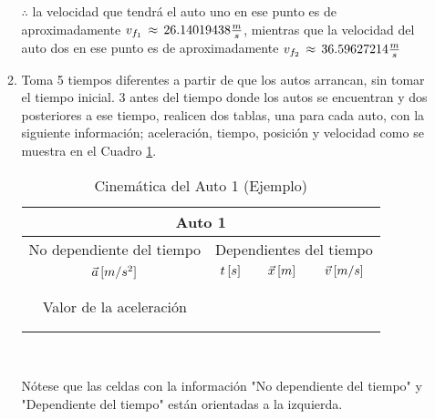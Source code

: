 \documentclass[letterpaper, 12pt]{article}
\begin{document}
\begin{enumerate}
\begin{enumerate}
            $\therefore$ \thinspace la velocidad que tendrá el auto uno en ese punto es de aproximadamente $v_{f_{1}} \thinspace \approx \thinspace 26.14019438 \frac{m}{s}$, mientras que la velocidad del auto dos en ese punto es de aproximadamente $v_{f_{2}} \thinspace \approx \thinspace 36.59627214 \frac{m}{s}$ \\
            
            \item Toma 5 tiempos diferentes a partir de que los autos arrancan, sin tomar el tiempo inicial. 3 antes del tiempo donde los autos se encuentran y dos posteriores a ese tiempo, realicen dos tablas, una para cada auto, con la siguiente información; aceleración, tiempo, posición y velocidad como se muestra en el Cuadro \ref{Cuadro 1: Cinemática del Auto 1 (Ejemplo)}.\\
            
            \begin{table}[h]
            \centering
                    \begin{tabular}{c|c|c|c|c|c}\hline \hline
                       \multicolumn{6}{c}{Auto 1}\\\hline
                       \multicolumn{3}{l|}{No dependiente del tiempo} & \multicolumn{3}{|l}{Dependientes del tiempo}\\\hline
                       \multicolumn{3}{c|}{$\vec{a}\thinspace [m/s^{2}]$} & {$t\thinspace[s]$} & {$\vec{x}\thinspace[m]$} & {$\vec{v}\thinspace[m/s]$}\\\hline
                       \multicolumn{3}{c|}{} &  &  & \\\cline{4-6}
                       \multicolumn{3}{c|}{} &  &  & \\\cline{4-6}
                       \multicolumn{3}{c|}{Valor de la aceleración} &  &  & \\\cline{4-6}
                       \multicolumn{3}{c|}{} &  &  & \\\cline{4-6}
                       \multicolumn{3}{c|}{} &  &  & \\\hline \hline
                    \end{tabular}\\
                    \caption{Cinemática del Auto 1 (Ejemplo)}
                    \label{Cuadro 1: Cinemática del Auto 1 (Ejemplo)}
            \end{table}
            
            Nótese que las celdas con la información "No dependiente del tiempo" y "Dependiente del tiempo" están orientadas a la izquierda.\\
            

\end{enumerate}
\end{enumerate}
\end{document}
